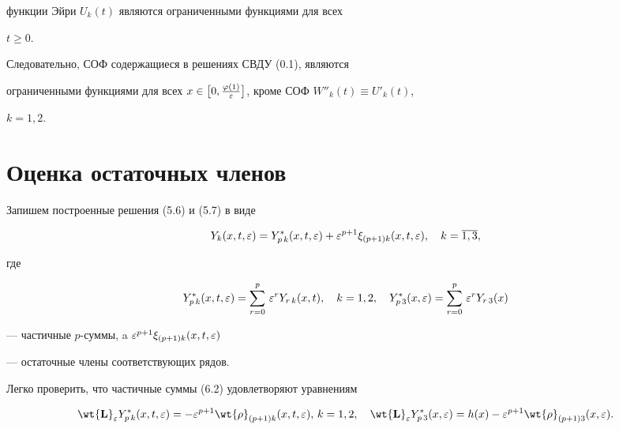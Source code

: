 функции Эйри $U_k (t)$ являются ограниченными функциями для всех


$t\geq 0$.





Следовательно, СОФ содержащиеся в решениях СВДУ (0.1), являются


ограниченными функциями для всех $x \in \bigl[ 0,


\frac{\f(1)}{\e} \bigr]$, кроме СОФ $ W''_k (t) \equiv U'_k (t)$,


$k =1,2$.








\section{Оценка остаточных членов}





Запишем построенные решения (5.6) и (5.7) в виде


\begin{equation}


Y_k (x, t, \e) = Y_{p\,k}^* (x, t, \e) + \e^{p+1}


\xi_{(p+1)k} (x, t, \e), \quad k = \overline{1,3},


\end{equation}


где


\begin{equation}


Y_{p\,k}^* (x,t,\e)=\sum_{r=0}^p\, \e^r Y_{r\,k}(x, t), \quad k=1,2, \quad


Y_{p\,3}^* (x, \e) = \sum \limits_{r=0} ^p\, \e^r Y_{r\,3}(x) 


\end{equation}


--- частичные $p$-суммы, a $\varepsilon^{p+1} \xi_{(p+1)k} (x, t, \varepsilon)$


--- остаточные члены соответствующих рядов.


Легко проверить, что частичные суммы (6.2) удовлетворяют уравнениям


\begin{equation}


\bold{\wt{L}}_{\e} Y_{p\,k}^* (x, t, \e) = - \e^{p + 1} {\wt{\rho}}_{(p+1)k}


(x,t, \e), \, k = 1,2, \quad \bold{\wt{L}}_{\e} Y_{p\,3}^* (x, \e) =


h (x) - \e^{p + 1} {\wt{\rho}}_{(p+1)3} (x, \e). 


\end{equation}





